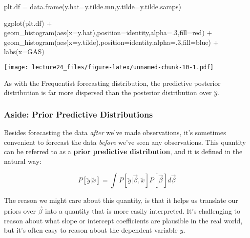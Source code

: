 \documentclass[
]{article}
\newenvironment{Shaded}{\begin{snugshade}}{\end{snugshade}}
\newcommand{\AttributeTok}[1]{\textcolor[rgb]{0.77,0.63,0.00}{#1}}
\newcommand{\DecValTok}[1]{\textcolor[rgb]{0.00,0.00,0.81}{#1}}
\newcommand{\FunctionTok}[1]{\textcolor[rgb]{0.00,0.00,0.00}{#1}}
\newcommand{\NormalTok}[1]{#1}
\newcommand{\OtherTok}[1]{\textcolor[rgb]{0.56,0.35,0.01}{#1}}
\newcommand{\SpecialCharTok}[1]{\textcolor[rgb]{0.00,0.00,0.00}{#1}}
\newcommand{\StringTok}[1]{\textcolor[rgb]{0.31,0.60,0.02}{#1}}
\begin{document}
\begin{Shaded}
\begin{Highlighting}[]
\NormalTok{plt.df }\OtherTok{=} \FunctionTok{data.frame}\NormalTok{(}\StringTok{\textquotesingle{}y.hat\textquotesingle{}}\OtherTok{=}\NormalTok{y.tilde.mn,}\StringTok{\textquotesingle{}y.tilde\textquotesingle{}}\OtherTok{=}\NormalTok{y.tilde.samps)}

\FunctionTok{ggplot}\NormalTok{(plt.df) }\SpecialCharTok{+}
  \FunctionTok{geom\_histogram}\NormalTok{(}\FunctionTok{aes}\NormalTok{(}\AttributeTok{x=}\NormalTok{y.hat),}\AttributeTok{position=}\StringTok{\textquotesingle{}identity\textquotesingle{}}\NormalTok{,}\AttributeTok{alpha=}\NormalTok{.}\DecValTok{3}\NormalTok{,}\AttributeTok{fill=}\StringTok{\textquotesingle{}red\textquotesingle{}}\NormalTok{) }\SpecialCharTok{+}
  \FunctionTok{geom\_histogram}\NormalTok{(}\FunctionTok{aes}\NormalTok{(}\AttributeTok{x=}\NormalTok{y.tilde),}\AttributeTok{position=}\StringTok{\textquotesingle{}identity\textquotesingle{}}\NormalTok{,}\AttributeTok{alpha=}\NormalTok{.}\DecValTok{3}\NormalTok{,}\AttributeTok{fill=}\StringTok{\textquotesingle{}blue\textquotesingle{}}\NormalTok{) }\SpecialCharTok{+}
  \FunctionTok{labs}\NormalTok{(}\AttributeTok{x=}\StringTok{\textquotesingle{}GAS\textquotesingle{}}\NormalTok{)}
\end{Highlighting}
\end{Shaded}

\texttt{[image: lecture24\_files/figure-latex/unnamed-chunk-10-1.pdf]}

As with the Frequentist forecasting distribution, the predictive
posterior distribution is far more dispersed than the posterior
distribution over \(\hat y\).

\hypertarget{aside-prior-predictive-distributions}{%
\subsubsection{Aside: Prior Predictive
Distributions}\label{aside-prior-predictive-distributions}}

Besides forecasting the data \emph{after} we've made observations, it's
sometimes convenient to forecast the data \emph{before} we've seen any
observations. This quantity can be referred to as a \textbf{prior
predictive distribution}, and it is defined in the natural way:

\[
P[\tilde y| \tilde x] = \int P[\tilde y | \vec \beta, \tilde x] P[\vec \beta] d \vec \beta
\]

The reason we might care about this quantity, is that it helps us
translate our priors over \(\vec \beta\) into a quantity that is more
easily interpreted. It's challenging to reason about what slope or
intercept coefficients are plausible in the real world, but it's often
easy to reason about the dependent variable \(y\).
\end{document}
